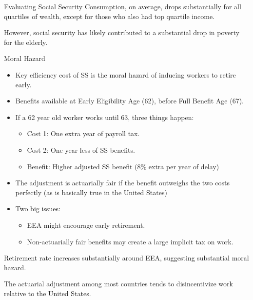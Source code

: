 \documentclass[8pt]{extarticle}
\begin{document}
\begin{problem}{Evaluating Social Security}
    Consumption, on average, drops substantially for all quartiles of wealth, except for those who also had top quartile income.\newline

    However, social security has likely contributed to a substantial drop in poverty for the elderly.
  \end{problem}
  \begin{problem}{Moral Hazard}
    \begin{itemize}
      \item Key efficiency cost of SS is the moral hazard of inducing workers to retire early.
      \item Benefits available at Early Eligibility Age (62), before Full Benefit Age (67).
      \item If a 62 year old worker works until 63, three things happen:
        \begin{itemize}
          \item Cost 1: One extra year of payroll tax.
          \item Cost 2: One year less of SS benefits.
          \item Benefit: Higher adjusted SS benefit (8\% extra per year of delay)
        \end{itemize}
      \item The adjustment is actuarially fair if the benefit outweighs the two costs perfectly (as is basically true in the United States)
      \item Two big issues:
        \begin{itemize}
          \item EEA might encourage early retirement.
          \item Non-actuarially fair benefits may create a large implicit tax on work.
        \end{itemize}
    \end{itemize}
    Retirement rate increases substantially around EEA, suggesting substantial moral hazard.\newline

    The actuarial adjustment among most countries tends to disincentivize work relative to the United States.
  \end{problem}
\end{document}
